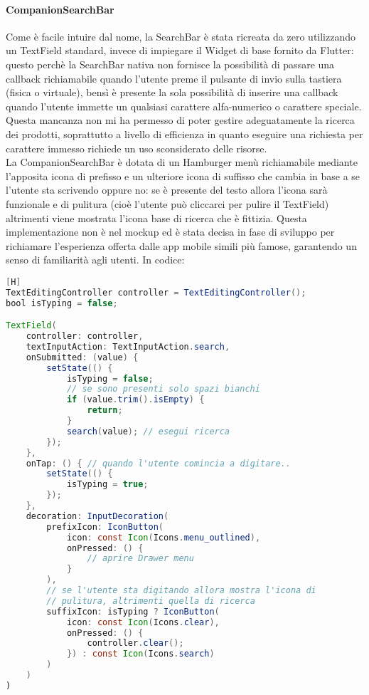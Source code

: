 \newpage
\paragraph{CompanionSearchBar}

\noindent
Come è facile intuire dal nome, la SearchBar è stata ricreata da zero utilizzando un TextField standard, invece di impiegare il Widget di base fornito da Flutter: questo perchè la SearchBar nativa non fornisce la possibilità di passare una callback richiamabile quando l'utente preme il pulsante di invio sulla tastiera (fisica o virtuale), bensì è presente la sola possibilità di inserire una callback quando l'utente immette un qualsiasi carattere alfa-numerico o carattere speciale. Questa mancanza non mi ha permesso di poter gestire adeguatamente la ricerca dei prodotti, soprattutto a livello di efficienza in quanto eseguire una richiesta per carattere immesso richiede un uso sconsiderato delle risorse.\\
La CompanionSearchBar è dotata di un Hamburger menù richiamabile mediante l'apposita icona di prefisso e un ulteriore icona di suffisso che cambia in base a se l'utente sta scrivendo oppure no: se è presente del testo allora l'icona sarà funzionale e di pulitura (cioè l'utente può cliccarci per pulire il TextField) altrimenti viene mostrata l'icona base di ricerca che è fittizia. Questa implementazione non è nel mockup ed è stata decisa in fase di sviluppo per richiamare l'esperienza offerta dalle app mobile simili più famose, garantendo un senso di familiarità agli utenti. In codice:
\begin{lstlisting}[language=Java, firstnumber=1][H]
TextEditingController controller = TextEditingController();
bool isTyping = false;

TextField(
	controller: controller,
	textInputAction: TextInputAction.search,
	onSubmitted: (value) {
		setState(() {
			isTyping = false;
			// se sono presenti solo spazi bianchi
			if (value.trim().isEmpty) {
				return;
			}
			search(value); // esegui ricerca
		});
	},
	onTap: () { // quando l'utente comincia a digitare..
		setState(() {
			isTyping = true;
		});
	},
	decoration: InputDecoration(
		prefixIcon: IconButton(
			icon: const Icon(Icons.menu_outlined),
			onPressed: () {
				// aprire Drawer menu
			}
		),
		// se l'utente sta digitando allora mostra l'icona di
		// pulitura, altrimenti quella di ricerca
		suffixIcon: isTyping ? IconButton(
			icon: const Icon(Icons.clear),
			onPressed: () {
				controller.clear();
			}) : const Icon(Icons.search)
		)
	)
)

\end{lstlisting}

